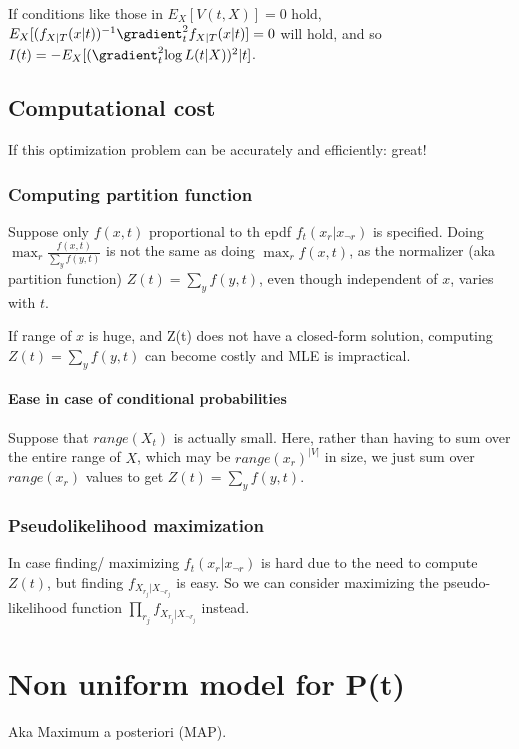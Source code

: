 \documentclass[oneside, article]{memoir}
\begin{document}
If conditions like those in $E_X[V(t, X)] = 0$ hold,\\ $E_X[(f_{X|T}(x|t))^{-1} \gradient_t^{2} f_{X|T}(x|t)] = 0$ will hold, and so \\$I(t) = -E_X[(\gradient_t^{2}{\log L(t|X)})^{2} | t]$.


\subsection{Computational cost}
If this optimization problem can be accurately and efficiently: great!

\subsubsection{Computing partition function}
Suppose only $f(x, t)$ proportional to th epdf $f_t(x_r|x_{\lnot r})$ is specified. Doing \\
$\max_r \frac{f(x, t)}{\sum_y f(y, t)}$ is not the same as doing $\max_r f(x, t)$, as the normalizer (aka partition function) $Z(t) = \sum_y f(y, t)$, even though independent of $x$,  varies with $t$.

If range of $x$ is huge, and Z(t) does not have a closed-form solution, computing $Z(t) = \sum_y f(y, t)$ can become costly and MLE is impractical.

\paragraph*{Ease in case of conditional probabilities}
Suppose that $range(X_t)$ is actually small. Here, rather than having to sum over the entire range of $X$,  which may be $range(x_r)^{|V|}$ in size, we just sum over $range(x_r)$ values to get $Z(t) = \sum_y f(y, t)$.

\subsubsection{Pseudolikelihood maximization}
In case finding/ maximizing $f_t(x_r|x_{\lnot r})$ is hard due to the need to compute $Z(t)$, but finding $f_{X_{r_j}|X_{\lnot r_j}}$ is easy. So we can consider maximizing the pseudo-likelihood function $\prod_{r_j} f_{X_{r_j}|X_{\lnot r_j}}$ instead.

\section{Non uniform model for P(t)}
Aka Maximum a posteriori (MAP).
\end{document}

